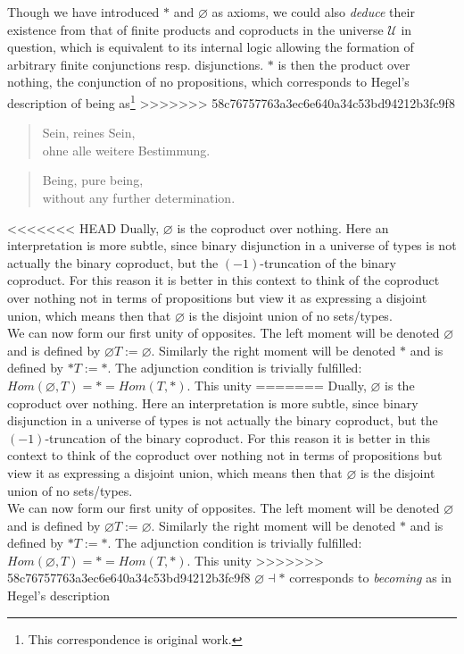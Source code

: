 \documentclass{article}
\begin{document}
Though we have introduced $*$ and $\varnothing$ as axioms, we could also \emph{deduce} their existence
from that of finite products and coproducts in the universe $\mathcal{U}$ in question, which is equivalent
to its internal logic allowing the formation of arbitrary finite conjunctions resp. disjunctions. $*$
is then the product over nothing, the conjunction of no propositions, which corresponds to Hegel's description
of being as\footnote{This correspondence is original work.} 
>>>>>>> 58c76757763a3ec6e640a34c53bd94212b3fc9f8

\begin{quote}
    Sein, reines Sein, \\
    ohne alle weitere Bestimmung.
\end{quote}

\begin{quote}
    Being, pure being, \\ 
    without any further determination.
\end{quote}

 

<<<<<<< HEAD
Dually, $\varnothing$ is the coproduct over nothing. Here an interpretation is more subtle, since binary 
disjunction in a universe of types is not actually the binary coproduct, but the $(-1)$-truncation of the 
binary coproduct. For this reason it is better in this context to think of the coproduct over nothing not in 
terms of propositions but view it as expressing a disjoint union, which means then that $\varnothing$ is the 
disjoint union of no sets/types. \\

We can now form our first unity of opposites. The left moment will be denoted $\varnothing$ and is defined by
$\varnothing T:= \varnothing$. Similarly the right moment will be denoted $*$ and is defined by $* T:= *$. 
The adjunction condition is trivially fulfilled: $Hom(\varnothing, T)=*=Hom(T, *)$. This unity 
=======
Dually, $\varnothing$ is the coproduct over nothing. Here an interpretation is more subtle, since binary
disjunction in a universe of types is not actually the binary coproduct, but the $(-1)$-truncation of
the binary coproduct. For this reason it is better in this context to think of the coproduct over nothing
not in terms of propositions but view it as expressing a disjoint union, which means then that $\varnothing$
is the disjoint union of no sets/types. \\

We can now form our first unity of opposites. The left moment will be denoted $\varnothing$ and is defined
by $\varnothing T:= \varnothing$. Similarly the right moment will be denoted $*$ and is defined by $*
T:= *$. The adjunction condition is trivially fulfilled: $Hom(\varnothing, T)=*=Hom(T, *)$. This unity
>>>>>>> 58c76757763a3ec6e640a34c53bd94212b3fc9f8
$\varnothing\dashv *$ corresponds to \emph{becoming} as in Hegel's description
\end{document}
